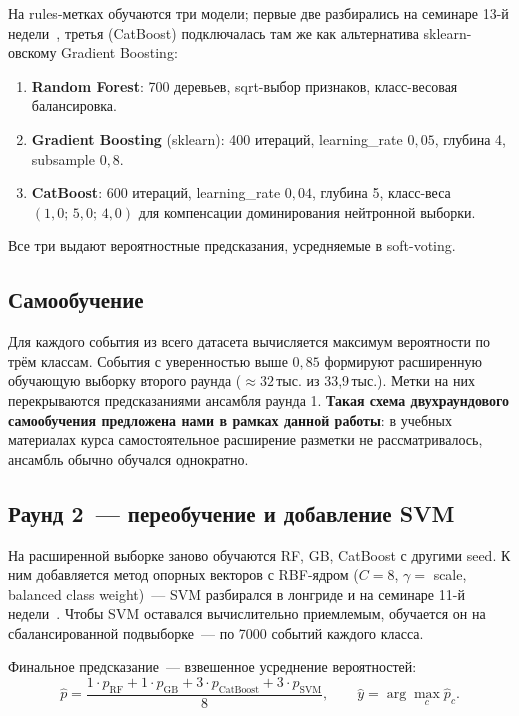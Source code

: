 \documentclass[11pt,a4paper]{article}
\begin{document}
На rules-метках обучаются три модели; первые две разбирались на
семинаре 13-й недели~\cite{lr13}, третья (CatBoost) подключалась
там же как альтернатива sklearn-овскому Gradient Boosting:

\begin{enumerate}
\item \textbf{Random Forest}: 700 деревьев, sqrt-выбор признаков,
  класс-весовая балансировка.
\item \textbf{Gradient Boosting} (sklearn): 400 итераций,
  learning\_rate $0{,}05$, глубина 4, subsample $0{,}8$.
\item \textbf{CatBoost}: 600 итераций, learning\_rate $0{,}04$,
  глубина 5, класс-веса $(1{,}0;\,5{,}0;\,4{,}0)$ для компенсации
  доминирования нейтронной выборки.
\end{enumerate}

Все три выдают вероятностные предсказания, усредняемые в soft-voting.

\subsection{Самообучение}

Для каждого события из всего датасета вычисляется максимум
вероятности по трём классам. События с уверенностью выше $0{,}85$
формируют расширенную обучающую выборку второго раунда
($\approx 32$\,тыс. из 33,9\,тыс.). Метки на них перекрываются
предсказаниями ансамбля раунда 1. \textbf{Такая схема двухраундового
самообучения предложена нами в рамках данной работы}: в учебных
материалах курса самостоятельное расширение разметки не
рассматривалось, ансамбль обычно обучался однократно.

\subsection{Раунд 2~--- переобучение и добавление SVM}

На расширенной выборке заново обучаются RF, GB, CatBoost с другими
seed. К ним добавляется метод опорных векторов с RBF-ядром
($C = 8$, $\gamma = $ scale, balanced class weight)~--- SVM
разбирался в лонгриде и на семинаре 11-й недели~\cite{lr11}.
Чтобы SVM оставался вычислительно приемлемым, обучается он на
сбалансированной подвыборке~--- по 7000 событий каждого класса.

Финальное предсказание~--- взвешенное усреднение вероятностей:
\begin{equation}
\hat{p} = \frac{1 \cdot p_\text{RF} + 1 \cdot p_\text{GB}
+ 3 \cdot p_\text{CatBoost} + 3 \cdot p_\text{SVM}}{8},
\qquad
\hat{y} = \arg\max_c \hat{p}_c.
\end{equation}
\end{document}

